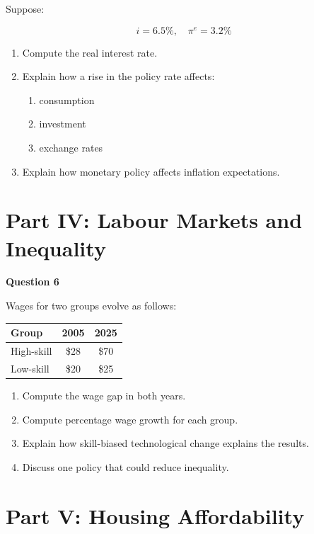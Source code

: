 \documentclass[12pt]{article}
\begin{document}
Suppose:

\[
i = 6.5\%, \quad \pi^e = 3.2\%
\]

\begin{enumerate}[label=(\alph*)]
\item Compute the real interest rate.
\item Explain how a rise in the policy rate affects:
\begin{enumerate}
\item consumption
\item investment
\item exchange rates
\end{enumerate}
\item Explain how monetary policy affects inflation expectations.
\end{enumerate}

\section*{Part IV: Labour Markets and Inequality}

\textbf{Question 6}

Wages for two groups evolve as follows:

\begin{center}
\begin{tabular}{lcc}
\toprule
Group & 2005 & 2025 \\
\midrule
High-skill & \$28 & \$70 \\
Low-skill & \$20 & \$25 \\
\bottomrule
\end{tabular}
\end{center}

\begin{enumerate}[label=(\alph*)]
\item Compute the wage gap in both years.
\item Compute percentage wage growth for each group.
\item Explain how skill-biased technological change explains the results.
\item Discuss one policy that could reduce inequality.
\end{enumerate}
\newpage
\section*{Part V: Housing Affordability}
\end{document}
